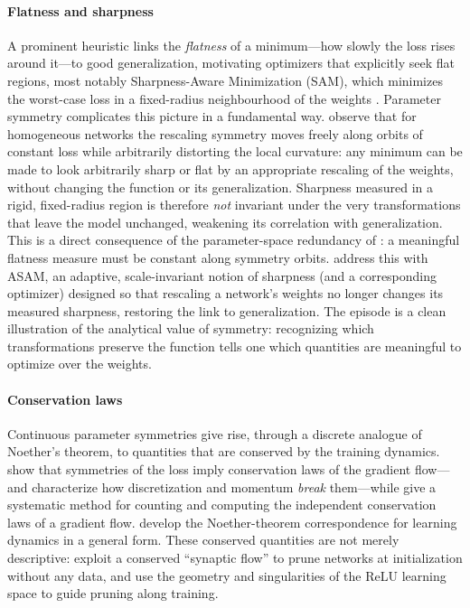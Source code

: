 \documentclass[mathematics,review,submit,moreauthors]{Definitions/mdpi}
\begin{document}
\paragraph{Flatness and sharpness}
A prominent heuristic links the \emph{flatness} of a minimum---how slowly the loss rises around it---to good generalization, motivating optimizers that explicitly seek flat regions, most notably Sharpness-Aware Minimization (SAM), which minimizes the worst-case loss in a fixed-radius neighbourhood of the weights \citep{foret2021}.
Parameter symmetry complicates this picture in a fundamental way.
\citet{dinh2017} observe that for homogeneous networks the rescaling symmetry moves freely along orbits of constant loss while arbitrarily distorting the local curvature: any minimum can be made to look arbitrarily sharp or flat by an appropriate rescaling of the weights, without changing the function or its generalization.
Sharpness measured in a rigid, fixed-radius region is therefore \emph{not} invariant under the very transformations that leave the model unchanged, weakening its correlation with generalization.
This is a direct consequence of the parameter-space redundancy of : a meaningful flatness measure must be constant along symmetry orbits.
\citet{kwon2021} address this with ASAM, an adaptive, scale-invariant notion of sharpness (and a corresponding optimizer) designed so that rescaling a network's weights no longer changes its measured sharpness, restoring the link to generalization.
The episode is a clean illustration of the analytical value of symmetry: recognizing which transformations preserve the function tells one which quantities are meaningful to optimize over the weights.

\paragraph{Conservation laws}
Continuous parameter symmetries give rise, through a discrete analogue of Noether's theorem, to quantities that are conserved by the training dynamics.
\citet{kunin2020} show that symmetries of the loss imply conservation laws of the gradient flow---and characterize how discretization and momentum \emph{break} them---while \citet{marcotte2023} give a systematic method for counting and computing the independent conservation laws of a gradient flow.
\citet{gluch2021} develop the Noether-theorem correspondence for learning dynamics in a general form.
These conserved quantities are not merely descriptive: \citet{tanaka2020anips} exploit a conserved ``synaptic flow'' to prune networks at initialization without any data, and \citet{nurisso2025} use the geometry and singularities of the ReLU learning space to guide pruning along training.
\end{document}
